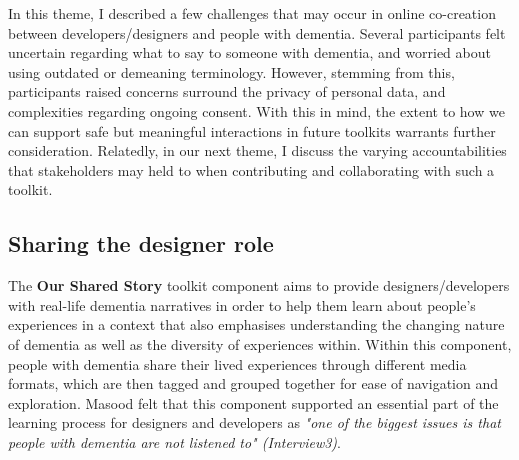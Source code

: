 In this theme, I described a few challenges that may occur in online co-creation between developers/designers and people with dementia. Several participants felt uncertain regarding what to say to someone with dementia, and worried about using outdated or demeaning terminology. However, stemming from this, participants raised concerns surround the privacy of personal data, and complexities regarding ongoing consent. With this in mind, the extent to how we can support safe but meaningful interactions in future toolkits warrants further consideration. Relatedly, in our next theme, I discuss the varying accountabilities that stakeholders may held to when contributing and collaborating with such a toolkit.

\subsection{Sharing the designer role}
The \textbf{Our Shared Story} toolkit component aims to provide designers/developers with real-life dementia narratives in order to help them learn about people’s experiences in a context that also emphasises understanding the changing nature of dementia as well as the diversity of experiences within. Within this component, people with dementia share their lived experiences through different media formats, which are then tagged and grouped together for ease of navigation and exploration. Masood felt that this component supported an essential part of the learning process for designers and developers as \textit{"one of the biggest issues is that people with dementia are not listened to" (Interview3)}. 


